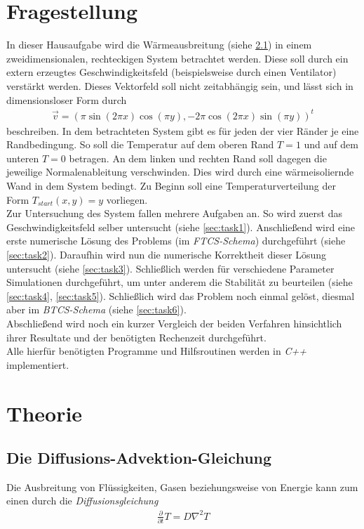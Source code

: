 \documentclass[12pt,a4paper,titlepage,headinclude,bibtotoc]{scrartcl}
\begin{document}
\section{Fragestellung}
\label{sec:fragestellung}
In dieser Hausaufgabe wird die Wärmeausbreitung (siehe \ref{sec:diff_adv}) in einem zweidimensionalen, rechteckigen System betrachtet werden. Diese soll durch ein extern erzeugtes Geschwindigkeitsfeld (beispielsweise durch einen Ventilator) verstärkt werden. Dieses Vektorfeld soll nicht zeitabhängig sein, und lässt sich in dimensionsloser Form durch
\begin{align*}
\vec{v} = (\pi \sin(2\pi x) \cos(\pi y), -2 \pi \cos(2\pi x) \sin(\pi y))^t
\end{align*}
beschreiben. In dem betrachteten System gibt es für jeden der vier Ränder je eine Randbedingung. So soll die Temperatur auf dem oberen Rand $T=1$ und auf dem unteren $T=0$ betragen. An dem linken und rechten Rand soll dagegen die jeweilige Normalenableitung verschwinden. Dies wird durch eine wärmeisoliernde Wand in dem System bedingt. Zu Beginn soll eine Temperaturverteilung der Form $T_{start}(x, y) = y$ vorliegen.\\

Zur Untersuchung des System fallen mehrere Aufgaben an. So wird zuerst das Geschwindigkeitsfeld selber untersucht (siehe \ref{sec:task1}). Anschließend wird eine erste numerische Lösung des Problems (im \textit{FTCS-Schema}) durchgeführt (siehe \ref{sec:task2}). Daraufhin wird nun die numerische Korrektheit dieser Lösung untersucht (siehe \ref{sec:task3}). Schließlich werden für verschiedene Parameter Simulationen durchgeführt, um unter anderem die Stabilität zu beurteilen (siehe \ref{sec:task4}, \ref{sec:task5}). Schließlich wird das Problem noch einmal gelöst, diesmal aber im \textit{BTCS-Schema} (siehe \ref{sec:task6}).\\
Abschließend wird noch ein kurzer Vergleich der beiden Verfahren hinsichtlich ihrer Resultate und der benötigten Rechenzeit durchgeführt.\\
Alle hierfür benötigten Programme und Hilfsroutinen werden in \textit{C++} implementiert.

\section{Theorie}
\label{sec:theorie}
\subsection{Die Diffusions-Advektion-Gleichung}
\label{sec:diff_adv}
Die Ausbreitung von Flüssigkeiten, Gasen beziehungsweise von Energie kann zum einen durch die \textit{Diffusionsgleichung}
\begin{align}
\label{eq:diff}
\frac{\partial}{\partial t}T = D \nabla^2 T 
\end{align}
\end{document}
